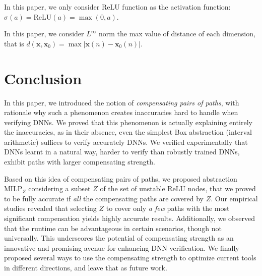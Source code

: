 \documentclass[a4paper,UKenglish,cleveref, autoref, thm-restate]{lipics-v2021}
\newcommand{\vx}{\boldsymbol{x}}
\newcommand{\MILP}{{\textrm{MILP}}}
\newcommand{\ReLU}{\mathrm{ReLU}}
\begin{document}
	In this paper, we only consider $\ReLU$ function as the activation function: $\sigma(a)=\ReLU(a)=\max(0,a)$. 
	
	In this paper, we consider $L^{\infty}$ norm the max value of distance of each dimension, that is $d(\vx,\boldsymbol{x}_0)=\max |\boldsymbol{x}(n)-\boldsymbol{x}_0(n)|$. 
	\fi
	
	









\section{Conclusion}

In this paper, we introduced the notion of {\em compensating pairs of paths}, with rationale why such a phenomenon creates inaccuracies hard to handle when verifying DNNs. We proved that this phenomenon is actually explaining entirely the inaccuracies, as in their absence, even the simplest Box abstraction (interval arithmetic) suffices to verify accurately DNNs. We verified experimentally that DNNs learnt in a natural way, harder to verify than robustly trained DNNs, exhibit paths with larger compensating strength. 



Based on this idea of compensating pairs of paths, we proposed abstraction $\MILP_{Z}$ considering a subset $Z$ of the set of unstable ReLU nodes, that we proved to be fully accurate if {\em all} the compensating paths are covered by $Z$. Our empirical studies revealed that selecting $Z$ to cover only {\em a few} paths with the most significant compensation yields highly accurate results. Additionally, we observed that the runtime can be advantageous in certain scenarios, though not universally. This underscores the potential of compensating strength as an innovative and promising avenue for enhancing DNN verification.
 We finally proposed several ways to use the compensating strength to optimize current tools in different directions, and leave that as future work.

\newpage




\newpage

\appendix


\end{document}
